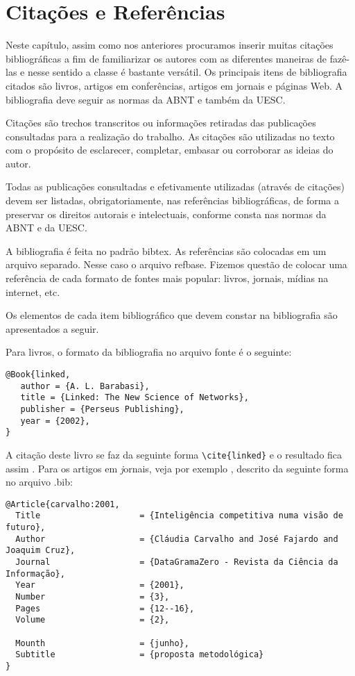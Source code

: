 %
% 
%

\chapter{Citações e Referências}\label{referencias}
Neste capítulo, assim como nos anteriores procuramos inserir muitas citações bibliográficas a fim de familiarizar os autores com as diferentes maneiras de fazê-las e nesse sentido a classe é bastante versátil. Os principais itens de bibliografia citados são livros, artigos em conferências,
artigos em jornais e páginas Web. A bibliografia deve seguir as normas da ABNT e também da UESC.

Citações são trechos transcritos ou informações retiradas das publicações consultadas para a realização do trabalho.
As citações são utilizadas no texto com o propósito de esclarecer, completar, embasar ou corroborar as ideias do autor.

Todas as publicações consultadas e efetivamente utilizadas (através de citações) devem ser listadas, obrigatoriamente, nas referências bibliográficas, de forma a preservar os direitos autorais e intelectuais, conforme consta nas normas da ABNT e da UESC.

A bibliografia é feita no padrão {\ttfamily bibtex}. As referências são colocadas em um arquivo separado. Nesse caso o arquivo  {\ttfamily refbase}. Fizemos questão de colocar uma referência de cada formato de fontes mais popular: livros, jornais, mídias na internet, etc.

Os elementos de cada item bibliográfico que devem constar na bibliografia são apresentados a seguir.

Para livros, o formato da bibliografia no arquivo fonte é o seguinte:

\begin{verbatim}
@Book{linked,
   author = {A. L. Barabasi},
   title = {Linked: The New Science of Networks},
   publisher = {Perseus Publishing},
   year = {2002},
}
\end{verbatim}

A citação deste livro se faz da seguinte forma \verb#\cite{linked}# e o resultado fica assim \cite{linked}.
Para os artigos em {\textit jornais}, veja por exemplo \cite{carvalho:2001},
descrito da seguinte forma no arquivo {\ttfamily .bib}:

\begin{verbatim}
@Article{carvalho:2001,
  Title                    = {Inteligência competitiva numa visão de futuro},
  Author                   = {Cláudia Carvalho and José Fajardo and Joaquim Cruz},
  Journal                  = {DataGramaZero - Revista da Ciência da Informação},
  Year                     = {2001},
  Number                   = {3},
  Pages                    = {12--16},
  Volume                   = {2},

  Mounth                   = {junho},
  Subtitle                 = {proposta metodológica}
}
\end{verbatim}


